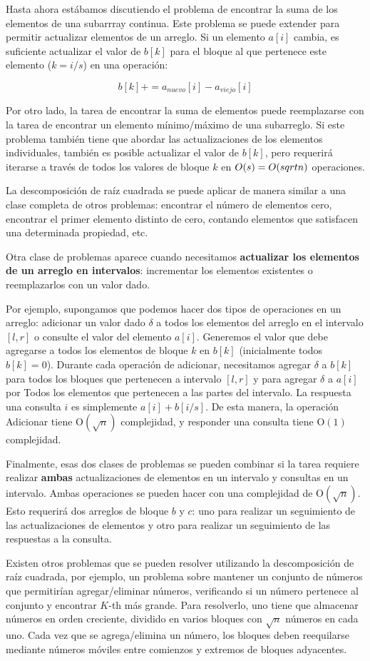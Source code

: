 Hasta ahora estábamos discutiendo el problema de encontrar la suma de los elementos de una subarrray continua. Este problema se puede extender para permitir actualizar elementos de un arreglo. Si un elemento $a[i]$ cambia, es suficiente actualizar el valor de $b[k]$ para el bloque al que pertenece este elemento ($k=i/s$) en una operación:

$$ b[k] += a_{nuevo}[i] - a_{viejo}[i] $$

Por otro lado, la tarea de encontrar la suma de elementos puede reemplazarse con la tarea de encontrar un elemento mínimo/máximo de una subarreglo. Si este problema también tiene que abordar las actualizaciones de los elementos individuales, también es posible actualizar el valor de $b[k]$, pero requerirá iterarse a través de todos los valores de bloque $k$ en $O(s) = O(\\sqrt{n})$ operaciones.

La descomposición de raíz cuadrada se puede aplicar de manera similar a una clase completa de otros problemas: encontrar el número de elementos cero, encontrar el primer elemento distinto de cero, contando elementos que satisfacen una determinada propiedad, etc.

Otra clase de problemas aparece cuando necesitamos \textbf{actualizar los elementos de un arreglo en intervalos}: incrementar los elementos existentes o reemplazarlos con un valor dado.

Por ejemplo, supongamos que podemos hacer dos tipos de operaciones en un arreglo: adicionar un valor dado $\delta$ a todos los elementos del arreglo en el intervalo $[l,r]$ o consulte el valor del elemento $a[i]$. Generemos el valor que debe agregarse a todos los elementos de bloque $k$ en $b[k]$ (inicialmente todos $ b[k] = 0 $). Durante cada operación de adicionar, necesitamos agregar $\delta$ a $b[k]$ para todos los bloques que pertenecen a intervalo $[l,r]$ y para agregar $\delta$ a $a[i]$ por Todos los elementos que pertenecen a las partes del intervalo. La respuesta una consulta $i$ es simplemente $a[i]+b[i/s]$. De esta manera, la operación Adicionar tiene O$(\sqrt{n})$ complejidad, y responder una consulta tiene O$(1)$ complejidad.

Finalmente, esas dos clases de problemas se pueden combinar si la tarea requiere realizar \textbf{ambas} actualizaciones de elementos en un intervalo y consultas en un intervalo. Ambas operaciones se pueden hacer con una complejidad de O$(\sqrt{n})$. Esto requerirá dos arreglos de bloque $b$ y $c$: uno para realizar un seguimiento de las actualizaciones de elementos y otro para realizar un seguimiento de las respuestas a la consulta.

Existen otros problemas que se pueden resolver utilizando la descomposición de raíz cuadrada, por ejemplo, un problema sobre mantener un conjunto de números que permitirían agregar/eliminar números, verificando si un número pertenece al conjunto y encontrar $K$-th más grande. Para resolverlo, uno tiene que almacenar números en orden creciente, dividido en varios bloques con $\sqrt {n}$ números en cada uno. Cada vez que se agrega/elimina un número, los bloques deben reequilarse mediante números móviles entre comienzos y extremos de bloques adyacentes.